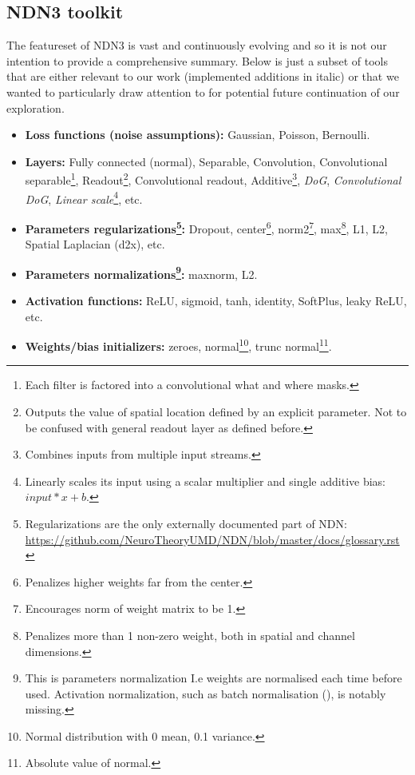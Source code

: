 \subsection{NDN3 toolkit}\label{ch:3.1.1}

The featureset of NDN3 is vast and continuously evolving and so it is not our intention to provide a comprehensive summary. Below is just a subset of tools that are either relevant to our work (implemented additions in italic) or that we wanted to particularly draw attention to for potential future continuation of our exploration.

\begin{itemize}
    \item \textbf{Loss functions (noise assumptions):} Gaussian, Poisson, Bernoulli.
    
    \item \textbf{Layers:} Fully connected (normal), Separable, Convolution, Convolutional separable\footnote{Each filter is factored into a convolutional what and where masks.}, Readout\footnote{Outputs the value of spatial location defined by an explicit parameter. Not to be confused with general readout layer as defined before.}, Convolutional readout, Additive\footnote{Combines inputs from multiple input streams.}, \textit{DoG}, \textit{Convolutional DoG}, \textit{Linear scale}\footnote{Linearly scales its input using a scalar multiplier and single additive bias: $input*x + b$.}, etc.
    
    \item \textbf{Parameters regularizations\footnote{Regularizations are the only externally documented part of NDN: \href{https://github.com/NeuroTheoryUMD/NDN/blob/master/docs/glossary.rst}{https://github.com{\-}/NeuroTheoryUMD/NDN/blob/master/docs/glossary.rst}}:} Dropout, center\footnote{Penalizes higher weights far from the center.}, norm2\footnote{Encourages norm of weight matrix to be 1.}, max\footnote{Penalizes more than 1 non-zero weight, both in spatial and channel dimensions.}, L1, L2, Spatial Laplacian (d2x), etc.
    
    \item \textbf{Parameters normalizations\footnote{This is parameters normalization I.e weights are normalised each time before used. Activation normalization, such as batch normalisation (\cite{2015arXiv150203167I}), is notably missing.}:} maxnorm, L2.
    
    \item \textbf{Activation functions:} ReLU, sigmoid, tanh, identity, SoftPlus, leaky ReLU, etc.
    
    \item \textbf{Weights/bias initializers:} zeroes, normal\footnote{Normal distribution with 0 mean, 0.1 variance.}, trunc normal\footnote{Absolute value of normal.}.
\end{itemize}

